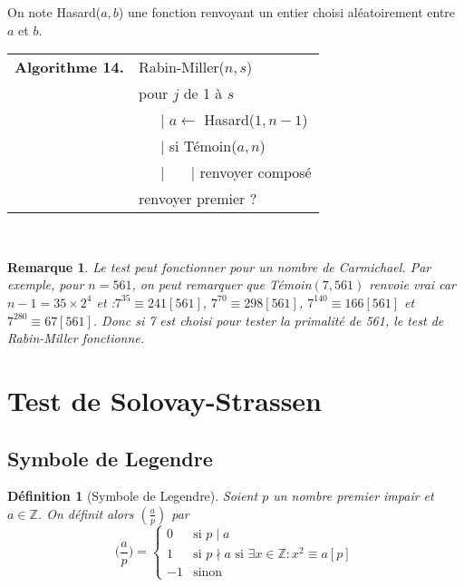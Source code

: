 \documentclass[10pt,a4paper]{report}
\newtheorem*{rem}{Remarque}
\newtheorem{Def}[thm]{Définition}
\begin{document}

On note Hasard($a,b$) une fonction renvoyant un entier choisi aléatoirement entre $a$ et $b$.

\begin{tabular}{ll}
\textbf{Algorithme 14.} & Rabin-Miller($n,s$)\\
           & pour $j$ de 1 à $s$ \\
           & \ \ \ {\rm |} $a \leftarrow$ Hasard($1,n-1$) \\      
           & \ \ \ {\rm |} si Témoin($a,n$) \\
           & \ \ \ {\rm |} \ \ \ {\rm |} renvoyer composé \\
           & renvoyer premier ?
\end{tabular}\\


\begin{rem}
Le test peut fonctionner pour un nombre de Carmichael. Par exemple, pour $n=561$, on peut remarquer que Témoin$(7,561)$ renvoie vrai car $n-1=35 \times 2^4$ et :$7^{35}\equiv 241 [561]$, $7^{70}\equiv 298 [561]$, $7^{140}\equiv 166 [561]$ et $7^{280}\equiv 67 [561]$. Donc si 7 est choisi pour tester la primalité de 561, le test de Rabin-Miller fonctionne.
\end{rem}

\section{Test de Solovay-Strassen}

\subsection{Symbole de Legendre}

\begin{Def}[Symbole de Legendre]
Soient $p$ un nombre premier impair et $a \in \mathbb{Z}$. On définit alors $(\tfrac{a}{p})$ par
\begin{equation*}
\Big( \frac{a}{p} \Big)= \left \{  \begin{array}{cl}
0 & \text{si }p\mid a \\
1 & \text{si }p \nmid a \text{ si }\exists x \in \mathbb{Z}: x^2 \equiv a [p]\\
-1 & \text{sinon}
\end{array}\right.
\end{equation*}
\end{Def}
\end{document}
